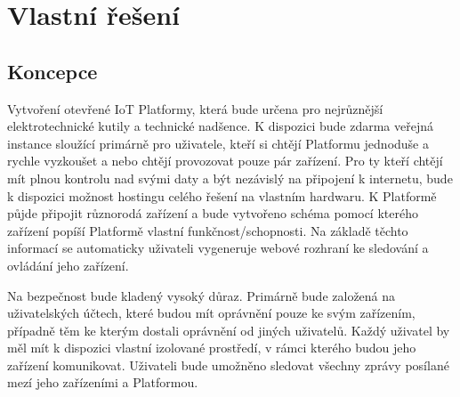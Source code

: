 \section{Vlastní řešení}

\subsection{Koncepce}
Vytvoření otevřené IoT Platformy, která bude určena pro nejrůznější elektrotechnické kutily a technické nadšence. K dispozici bude zdarma veřejná instance sloužící primárně pro uživatele, kteří si chtějí Platformu jednoduše a rychle vyzkoušet a nebo chtějí provozovat pouze pár zařízení. Pro ty kteří chtějí mít plnou kontrolu nad svými daty a být nezávislý na připojení k internetu, bude k dispozici možnost hostingu celého řešení na vlastním hardwaru. K Platformě půjde připojit různorodá zařízení a bude vytvořeno schéma pomocí kterého zařízení popíší Platformě vlastní funkčnost/schopnosti. Na základě těchto informací se automaticky uživateli vygeneruje webové rozhraní ke sledování a ovládání jeho zařízení.

Na bezpečnost bude kladený vysoký důraz. Primárně bude založená na uživatelských účtech, které budou mít oprávnění pouze ke svým zařízením, případně těm ke kterým dostali oprávnění od jiných uživatelů. Každý uživatel by měl mít k dispozici vlastní izolované prostředí, v rámci kterého budou jeho zařízení komunikovat. Uživateli bude umožněno sledovat všechny zprávy posílané mezí jeho zařízeními a Platformou.


